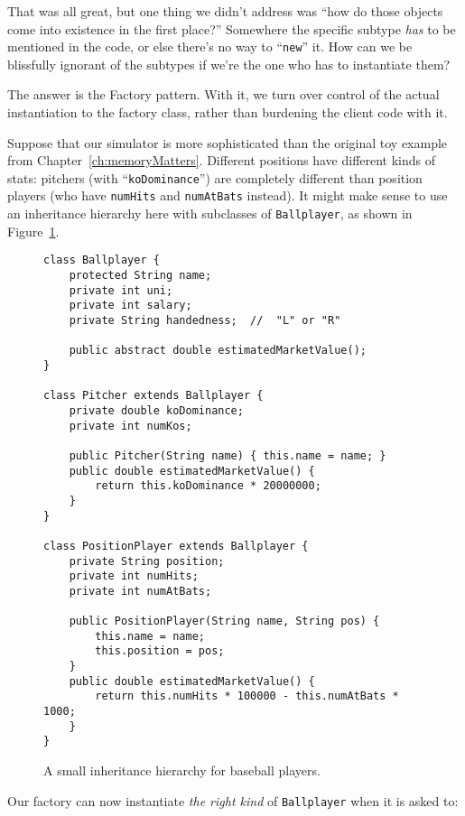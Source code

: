 That was all great, but one thing we didn't address was ``how do those objects
come into existence in the first place?'' Somewhere the specific subtype
\textit{has} to be mentioned in the code, or else there's no way to
``\texttt{new}'' it. How can we be blissfully ignorant of the subtypes if we're
the one who has to instantiate them?

The answer is the Factory pattern. With it, we turn over control of the actual
instantiation to the factory class, rather than burdening the client code with
it.

Suppose that our simulator is more sophisticated than the original toy example
from Chapter~\ref{ch:memoryMatters}. Different positions have different kinds
of stats: pitchers (with ``\texttt{koDominance}'') are completely different
than position players (who have \texttt{numHits} and \texttt{numAtBats}
instead). It might make sense to use an inheritance hierarchy here with
subclasses of \texttt{Ballplayer}, as shown in
Figure~\ref{ballplayerInheritance}.

\begin{figure}[ht]
\begin{Verbatim}[fontsize=\scriptsize,samepage=true,frame=single]
class Ballplayer {
    protected String name;
    private int uni;
    private int salary;
    private String handedness;  //  "L" or "R"

    public abstract double estimatedMarketValue();
}

class Pitcher extends Ballplayer {
    private double koDominance;
    private int numKos;

    public Pitcher(String name) { this.name = name; }
    public double estimatedMarketValue() {
        return this.koDominance * 20000000;
    }
}

class PositionPlayer extends Ballplayer {
    private String position;
    private int numHits;
    private int numAtBats;

    public PositionPlayer(String name, String pos) {
        this.name = name;
        this.position = pos;
    }
    public double estimatedMarketValue() {
        return this.numHits * 100000 - this.numAtBats * 1000;
    }
}
\end{Verbatim}
\caption{A small inheritance hierarchy for baseball players.}
\label{ballplayerInheritance}
\end{figure}

Our factory can now instantiate \textit{the right kind} of \texttt{Ballplayer}
when it is asked to:

